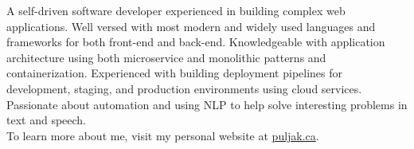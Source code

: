 

\begin{cvparagraph}

A self-driven software developer experienced in building complex web applications. Well versed with most modern and widely used languages and frameworks for both front-end and back-end. Knowledgeable with application architecture using both microservice and monolithic patterns and containerization. Experienced with building deployment pipelines for development, staging, and production environments using cloud services. Passionate about automation and using NLP to help solve interesting problems in text and speech.
\\[2mm]
To learn more about me, visit my personal website at \href{https://puljak.ca}{puljak.ca}.

\end{cvparagraph}